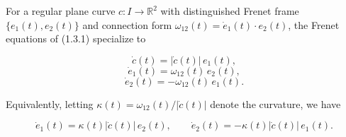 For a regular plane curve $c: I \to \mathbb{R}^2$ with distinguished Frenet frame $\{e_1(t), e_2(t)\}$ and connection form $\omega_{12}(t) = \dot{e}_1(t) \cdot e_2(t)$, the Frenet equations of (1.3.1) specialize to

$$\dot{c}(t) = |\dot{c}(t)| \, e_1(t),$$
$$\dot{e}_1(t) = \omega_{12}(t) \, e_2(t),$$
$$\dot{e}_2(t) = -\omega_{12}(t) \, e_1(t).$$

Equivalently, letting $\kappa(t) = \omega_{12}(t)/|\dot{c}(t)|$ denote the curvature, we have

$$\dot{e}_1(t) = \kappa(t) |\dot{c}(t)| \, e_2(t), \qquad \dot{e}_2(t) = -\kappa(t) |\dot{c}(t)| \, e_1(t).$$
